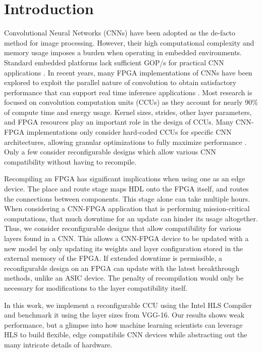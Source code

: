 \chapter {Introduction}
 
Convolutional Neural Networks (CNNs) have been adopted as the de-facto method for image processing. However, their high computational complexity and memory usage imposes a burden when operating in embedded environments. Standard embedded platforms lack sufficient GOP/s for practical CNN applications \cite{guo2018angel}. In recent years, many FPGA implementations of CNNs have been explored to exploit the parallel nature of convolution to obtain satisfactory performance that can support real time inference applications \cite{toledo2012fpga}. Most research is focused on convolution computation units (CCUs) as they account for nearly 90\% of compute time and energy usage. Kernel sizes, strides, other layer parameters, and FPGA resources play an important role in the design of CCUs. Many CNN-FPGA implementations only consider hard-coded CCUs for specific CNN architectures, allowing granular optimizations to fully maximize performance \cite{liu2016automatic, toledo2012fpga, hwang2017efficient, bettoni2017convolutional, jiao2017accelerating}. Only a few consider reconfigurable designs which allow various CNN compatibility without having to recompile\cite{tu2017deep, dicecco2016caffeinated, lu2017evaluating}.

Recompiling an FPGA has significant implications when using one as an edge device. The place and route stage maps HDL onto the FPGA itself, and routes the connections between components. This stage alone can take multiple hours. When considering a CNN-FPGA application that is performing mission-critical computations, that much downtime for an update can hinder its usage altogether. Thus, we consider reconfigurable designs that allow compatibility for various layers found in a CNN. This allows a CNN-FPGA device to be updated with a new model by only updating its weights and layer configuration stored in the external memory of the FPGA. If extended downtime is permissible, a reconfigurable design on an FPGA can update with the latest breakthrough methods, unlike an ASIC device. The penalty of recompilation would only be necessary for modifications to the layer compatibility itself.

In this work, we implement a reconfigurable CCU using the Intel HLS Compiler and benchmark it using the layer sizes from VGG-16. Our results shows weak performance, but a glimpse into how machine learning scientists can leverage HLS to build flexible, edge compatibile CNN devices while abstracting out the many intricate details of hardware.


